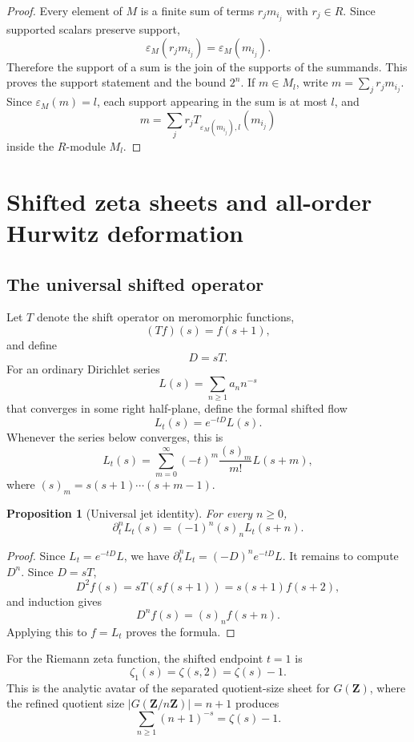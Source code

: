 \documentclass[11pt]{article}
\newcommand{\Z}{\mathbf Z}
\newcommand{\eps}{\varepsilon}
\theoremstyle{plain}
\newtheorem{proposition}[theorem]{Proposition}
\theoremstyle{definition}
\begin{document}
\begin{proof}
Every element of \(M\) is a finite sum of terms \(r_jm_{i_j}\) with \(r_j\in R\).  Since supported scalars preserve support,
\[
   \eps_M(r_jm_{i_j})=\eps_M(m_{i_j}).
\]
Therefore the support of a sum is the join of the supports of the summands.  This proves the support statement and the bound \(2^n\).  If \(m\in M_l\), write \(m=\sum_j r_jm_{i_j}\).  Since \(\eps_M(m)=l\), each support appearing in the sum is at most \(l\), and
\[
   m=\sum_j r_j T_{\eps_M(m_{i_j}),l}(m_{i_j})
\]
inside the \(R\)-module \(M_l\).
\end{proof}

\section{Shifted zeta sheets and all-order Hurwitz deformation}

\subsection{The universal shifted operator}

Let \(T\) denote the shift operator on meromorphic functions,
\[
   (Tf)(s)=f(s+1),
\]
and define
\[
   D=sT.
\]
For an ordinary Dirichlet series
\[
   L(s)=\sum_{n\ge1}a_n n^{-s}
\]
that converges in some right half-plane, define the formal shifted flow
\[
   L_t(s)=e^{-tD}L(s).
\]
Whenever the series below converges, this is
\[
   L_t(s)=\sum_{m=0}^\infty (-t)^m\frac{(s)_m}{m!}L(s+m),
\]
where \((s)_m=s(s+1)\cdots(s+m-1)\).

\begin{proposition}[Universal jet identity]\label{prop:universal-jet}
For every \(n\ge0\),
\[
   \partial_t^nL_t(s)=(-1)^n(s)_nL_t(s+n).
\]
\end{proposition}

\begin{proof}
Since \(L_t=e^{-tD}L\), we have \(\partial_t^nL_t=(-D)^ne^{-tD}L\).  It remains to compute \(D^n\).  Since \(D=sT\),
\[
   D^2 f(s)=sT(sf(s+1))=s(s+1)f(s+2),
\]
and induction gives
\[
   D^n f(s)=(s)_n f(s+n).
\]
Applying this to \(f=L_t\) proves the formula.
\end{proof}

For the Riemann zeta function, the shifted endpoint \(t=1\) is
\[
   \zeta_1(s)=\zeta(s,2)=\zeta(s)-1.
\]
This is the analytic avatar of the separated quotient-size sheet for \(G(\Z)\), where the refined quotient size \(|G(\Z/n\Z)|=n+1\) produces
\[
   \sum_{n\ge1}(n+1)^{-s}=\zeta(s)-1.
\]
\end{document}
